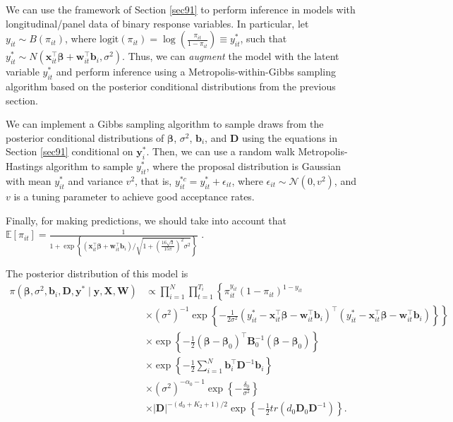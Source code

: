 We can use the framework of Section \ref{sec91} to perform inference in models with longitudinal/panel data of binary response variables. In particular, let $y_{it} \sim B(\pi_{it})$, where $\text{logit}(\pi_{it}) = \log\left(\frac{\pi_{it}}{1 - \pi_{it}}\right) \equiv y_{it}^*$, such that $y_{it}^* \sim N(\bm{x}_{it}^{\top} \bm{\beta} + \bm{w}_{it}^{\top} \bm{b}_i, \sigma^2)$. Thus, we can \textit{augment} the model with the latent variable $y_{it}^*$ and perform inference using a Metropolis-within-Gibbs sampling algorithm based on the posterior conditional distributions from the previous section. 

We can implement a Gibbs sampling algorithm to sample draws from the posterior conditional distributions of $\bm{\beta}$, $\sigma^2$, $\bm{b}_i$, and $\bm{D}$ using the equations in Section \ref{sec91} conditional on $\bm{y}_i^*$. Then, we can use a random walk Metropolis-Hastings algorithm to sample $y_{it}^*$, where the proposal distribution is Gaussian with mean $y_{it}^*$ and variance $v^2$, that is, $y_{it}^{*c} = y_{it}^* + \epsilon_{it}$, where $\epsilon_{it} \sim \mathcal{N}(0, v^2)$, and $v$ is a tuning parameter to achieve good acceptance rates. 

Finally, for making predictions, we should take into account that $\mathbb{E}[\pi_{it}] = \frac{1}{1 + \exp\left\{(\bm{x}_{it}^{\top} \bm{\beta} + \bm{w}_{it}^{\top} \bm{b}_i)/\sqrt{1 + \left(\frac{16\sqrt{3}}{15\pi}\right)^2 \sigma^2}\right\}}$ \cite[~pag. 136]{diggle2002analysis}.

The posterior distribution of this model is
\begin{align*}
	\pi(\bm{\beta},\sigma^2, \bm{b}_i, \bm{D}, \bm{y}^*\mid \bm{y}, \bm{X}, \bm{W})&\propto \prod_{i=1}^N \prod_{t=1}^{T_i}\left\{\pi_{it}^{y_{it}}(1-\pi_{it})^{1-y_{it}}\right.\\
	&\left.\times (\sigma^2)^{-1}\exp\left\{-\frac{1}{2\sigma^2}(y_{it}^*-\bm{x}_{it}^{\top}\bm{\beta}-\bm{w}_{it}^{\top}\bm{b}_i)^{\top}(y_{it}^*-\bm{x}_{it}^{\top}\bm{\beta}-\bm{w}_{it}^{\top}\bm{b}_i)\right\}\right\}\\
	&\times \exp\left\{-\frac{1}{2}(\bm{\beta}-\bm{\beta}_0)^{\top}\bm{B}_0^{-1}(\bm{\beta}-\bm{\beta}_0)\right\}\\
	&\times \exp\left\{-\frac{1}{2}\sum_{i=1}^N \bm{b}_i^{\top}\bm{D}^{-1}\bm{b}_i\right\}\\
	&\times (\sigma^2)^{-\alpha_0-1}\exp\left\{-\frac{\delta_0}{\sigma^2}\right\}\\
	&\times |\bm{D}|^{-(d_0+K_2+1)/2}\exp\left\{-\frac{1}{2}tr(d_0\bm{D}_0\bm{D}^{-1})\right\}.	
\end{align*}

